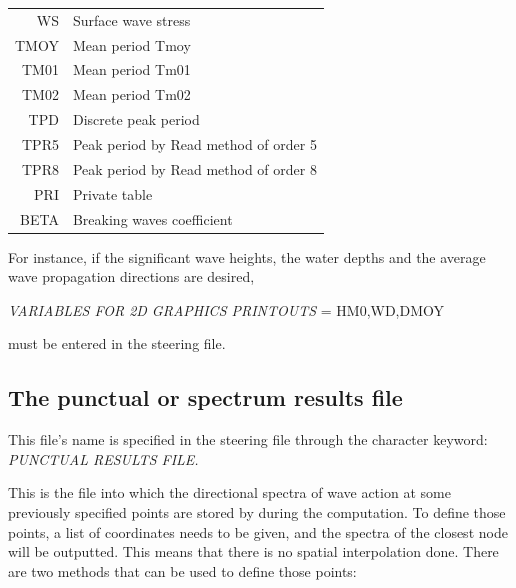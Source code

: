 \begin{longtable}{rl}
WS &  Surface wave stress  \\
TMOY  &  Mean period Tmoy  \\
TM01  &  Mean period Tm01  \\
TM02  &  Mean period Tm02  \\
TPD  &  Discrete peak period  \\
TPR5  &  Peak period by Read method of order 5  \\
TPR8  &  Peak period by Read method of order 8  \\
PRI  &  Private table  \\
BETA &  Breaking waves coefficient \\
%
\end{longtable}


For instance, if the significant wave heights, the water depths and the average wave
propagation directions are desired,

 \textit{VARIABLES FOR 2D GRAPHICS PRINTOUTS }= HM0,WD,DMOY

 must be entered in the steering file.


\subsection{ The punctual or spectrum results file}
\label{se:SpeFile}

This file's name is specified in the steering file through the character keyword:
\textit{PUNCTUAL RESULTS FILE.}

This is the file into which the directional spectra of wave action at some previously
specified points are stored by \tomawac during the computation. To define those points,
a list of coordinates needs to be given, and the spectra of the closest node will be
outputted. This means that there is no spatial interpolation done. There are two methods
that can be used to define those points:

